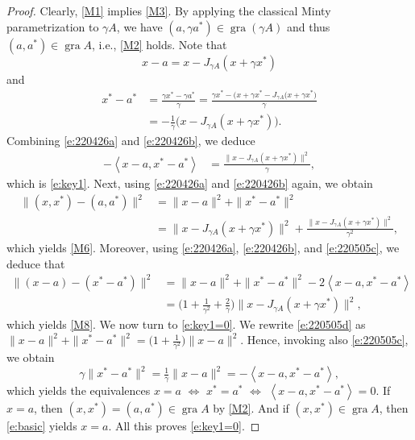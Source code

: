 \documentclass[10pt,a4paper]{amsart}
\newcommand{\gr}{\ensuremath{\operatorname{gra}}}
\newcommand{\scal}[2]{\left\langle{#1},{#2}  \right\rangle}
\begin{document}
\begin{proof}
Clearly, \cref{M1} implies \cref{M3}. 
By applying the classical Minty parametrization to $\gamma A$, 
we have $(a,\gamma a^*)\in\gr(\gamma A)$ and thus $(a,a^*)\in \gr A$, 
i.e., \cref{M2} holds. 
Note that 
\begin{equation}
\label{e:220426a}
x-a = x-J_{\gamma A}(x+\gamma x^*)
\end{equation}
and 
\begin{subequations}
\label{e:220426b}
\begin{align}
x^*-a^* 
&= \frac{\gamma x^*-\gamma a^*}{\gamma}
= \frac{\gamma x^* - \big(x+\gamma x^*-J_{\gamma A}(x+\gamma x^*\big)}{\gamma}\\
&= -\frac{1}{\gamma}\big(x - J_{\gamma A}(x+\gamma x^*)\big). 
\end{align}
\end{subequations}
Combining \cref{e:220426a} and \cref{e:220426b}, we deduce 
\begin{align}
\label{e:220505c}
-\scal{x-a}{x^*-a^*} 
&= 
\frac{\|x-J_{\gamma A}(x+\gamma x^*)\|^2}{\gamma},
\end{align}
which is \cref{e:key1}. 
Next, using \cref{e:220426a} and \cref{e:220426b} again, we obtain 
\begin{subequations}
\label{e:220505d}
\begin{align}
\|(x,x^*)-(a,a^*)\|^2
&= 
\|x-a\|^2 + \|x^*-a^*\|^2\\
&= 
\|x-J_{\gamma A}(x+\gamma x^*)\|^2 
+ \frac{\|x-J_{\gamma A}(x+\gamma x^*)\|^2}{\gamma^2}, 
\end{align}
\end{subequations}
which yields \cref{M6}. 
Moreover, using \cref{e:220426a}, \cref{e:220426b}, and 
\cref{e:220505c}, we deduce that 
\begin{subequations}
\begin{align}
\big\|(x-a)-(x^*-a^*)\big\|^2
&= \|x-a\|^2 + \|x^*-a^*\|^2 - 2\scal{x-a}{x^*-a^*}\\
&= \big(1+\tfrac{1}{\gamma^2}+\tfrac{2}{\gamma} \big)\|x-J_{\gamma A}(x+\gamma x^*)\|^2, 
\end{align}
\end{subequations}
which yields \cref{M8}.
We now turn to \cref{e:key1=0}. 
We rewrite \cref{e:220505d} as 
$\|x-a\|^2+\|x^*-a^*\|^2 
= \big(1+\tfrac{1}{\gamma^2}\big)\|x-a\|^2$.
Hence, invoking also \cref{e:220505c}, we obtain
\begin{equation}
\gamma\|x^*-a^*\|^2 = 
\tfrac{1}{\gamma}\|x-a\|^2 = -\scal{x-a}{x^*-a^*},
\end{equation}
which yields the equivalences 
$x=a$
$\Leftrightarrow$
$x^*=a^*$
$\Leftrightarrow$
$\scal{x-a}{x^*-a^*}=0$.
If $x=a$, then $(x,x^*)=(a,a^*)\in \gr A$ by \cref{M2}.
And if $(x,x^*)\in\gr A$, 
then \cref{e:basic} yields $x=a$.
All this proves \cref{e:key1=0}.
\end{proof}
\end{document}

